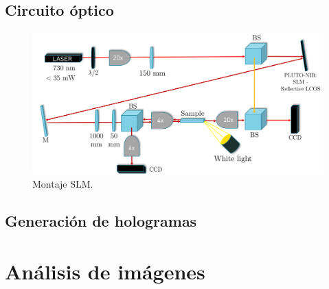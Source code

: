 \subsection{Circuito óptico}
\begin{figure}[H]
	\centering
	\includegraphics[width=\linewidth]{media/SLMsetup}
	\caption{Montaje SLM.}
\end{figure}
\subsection{Generación de hologramas}
\section{Análisis de imágenes}

